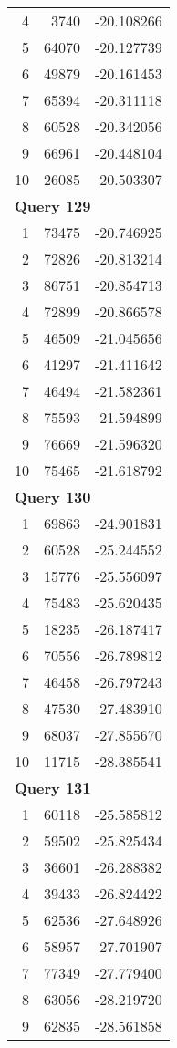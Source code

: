 \begin{longtable}[{p}]{@{}rrp{}@{}}
4 & 3740 & -20.108266 \\
5 & 64070 & -20.127739 \\
6 & 49879 & -20.161453 \\
7 & 65394 & -20.311118 \\
8 & 60528 & -20.342056 \\
9 & 66961 & -20.448104 \\
10 & 26085 & -20.503307 \\
\midrule
\multicolumn{3}{l}{\bfseries Query 129} \\
1 & 73475 & -20.746925 \\
2 & 72826 & -20.813214 \\
3 & 86751 & -20.854713 \\
4 & 72899 & -20.866578 \\
5 & 46509 & -21.045656 \\
6 & 41297 & -21.411642 \\
7 & 46494 & -21.582361 \\
8 & 75593 & -21.594899 \\
9 & 76669 & -21.596320 \\
10 & 75465 & -21.618792 \\
\midrule
\multicolumn{3}{l}{\bfseries Query 130} \\
1 & 69863 & -24.901831 \\
2 & 60528 & -25.244552 \\
3 & 15776 & -25.556097 \\
4 & 75483 & -25.620435 \\
5 & 18235 & -26.187417 \\
6 & 70556 & -26.789812 \\
7 & 46458 & -26.797243 \\
8 & 47530 & -27.483910 \\
9 & 68037 & -27.855670 \\
10 & 11715 & -28.385541 \\
\midrule
\multicolumn{3}{l}{\bfseries Query 131} \\
1 & 60118 & -25.585812 \\
2 & 59502 & -25.825434 \\
3 & 36601 & -26.288382 \\
4 & 39433 & -26.824422 \\
5 & 62536 & -27.648926 \\
6 & 58957 & -27.701907 \\
7 & 77349 & -27.779400 \\
8 & 63056 & -28.219720 \\
9 & 62835 & -28.561858 \\

\end{longtable}
